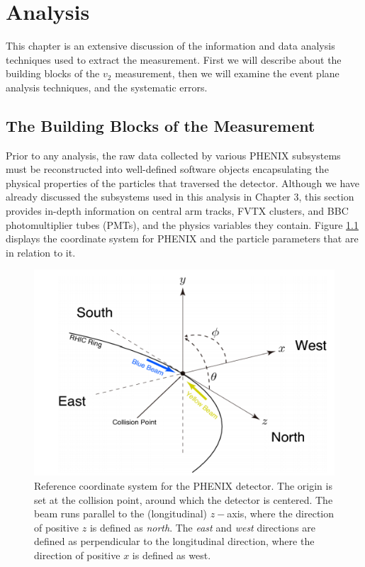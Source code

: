 \chapter{Analysis}
This chapter is an extensive discussion of the information and data analysis techniques used to extract the measurement. First we will describe about the building blocks of the  $v_2$ measurement, then we will examine the event plane analysis techniques, and the systematic errors.
\section{The Building Blocks of the Measurement}
Prior to any analysis, the raw data collected by various PHENIX subsystems must be reconstructed into well-defined software objects encapsulating the physical properties of the particles that traversed the detector. Although we have already discussed the subsystems used in this analysis in Chapter 3, this section provides in-depth information on central arm tracks, FVTX clusters, and BBC photomultiplier tubes (PMTs), and the physics variables they contain. Figure \ref{fig:phenix_coord_system} displays the coordinate system for PHENIX and the particle parameters that are in relation to it.


\begin{figure}[!h]
\begin{center}
\includegraphics[width=0.55\linewidth]{figs/phenix_coord.png}
\caption{Reference coordinate system for the PHENIX detector. The origin is set at the collision point, around which the detector is centered. The beam runs parallel to the (longitudinal) $z-$axis, where the direction of positive $z$ is defined as \emph{north}. The \emph{east} and \emph{west} directions are defined as perpendicular to the longitudinal direction, where the direction of positive $x$ is defined as west.}
\label{fig:phenix_coord_system}
\end{center}
\end{figure}

